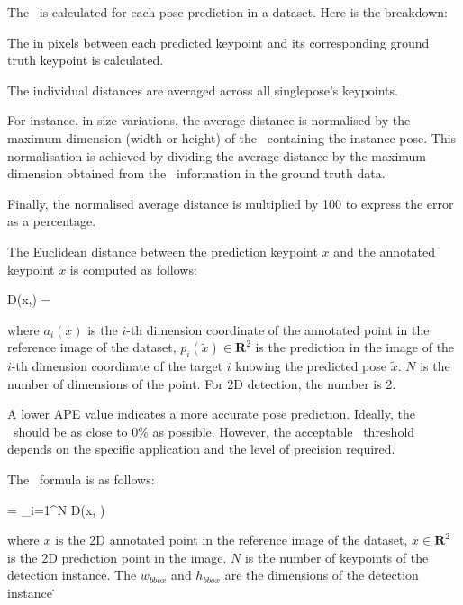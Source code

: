The \APE\ is calculated for each pose prediction in a dataset. Here is the breakdown:

\startitemize[n]
 \item {} The  in pixels between each predicted keypoint and its corresponding ground truth keypoint is calculated.
 \item {} The individual distances are averaged across all single\break pose's keypoints.
 \item {} For instance, in size variations, the average distance is normalised by the maximum dimension (width or height) of the \BBOX\ containing the instance pose. This normalisation is achieved by dividing the average distance by the maximum dimension obtained from the \BBOX\ information in the ground truth data.
 \item {} Finally, the normalised average distance is multiplied by 100 to express the error as a percentage.
\stopitemize

The Euclidean distance between the prediction keypoint $ x $ and the annotated keypoint $ \tilde{x}$ is computed as follows:

\startplaceformula[reference=formula:euclidean-distance]
 \startformula D(x,) = 
 \stopformula
\stopplaceformula

where $ a_i (x) $ is the $ i $-th dimension coordinate of the annotated point in the reference image of the dataset, $ p_i (\tilde{x}) \in \mathbf R^2 $ is the prediction in the image of the $ i $-th dimension coordinate of the target $ i $ knowing the predicted pose $ \tilde{x} $. $ N $ is the number of dimensions of the point. For 2D detection, the number is 2.

A lower APE value indicates a more accurate pose prediction. Ideally, the \APE\ should be as close to 0\% as possible. However, the acceptable \APE\ threshold depends on the specific application and the level of precision required.

The \APE\ formula is as follows:

\startplaceformula[reference=formula:ape]
 \startformula \mbox{\APE} =  \sum_{i=1}^{N} D(x, ) 
 \stopformula
\stopplaceformula

where $ x $ is the 2D annotated point in the reference image of the dataset, $ \tilde{x} \in \mathbf R^2 $ is the 2D prediction point in the image. $ N $ is the number of keypoints of the detection instance. The $ w_{bbox} $ and $ h_{bbox} $ are the dimensions of the detection instance \BBOX\.

